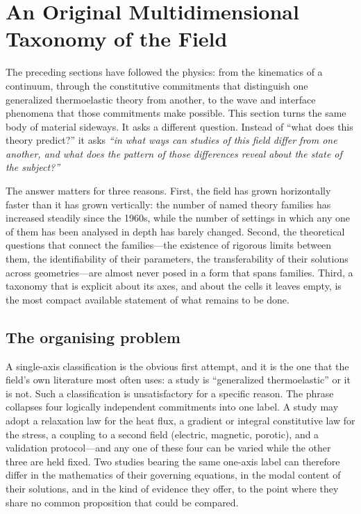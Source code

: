 \section{An Original Multidimensional Taxonomy of the Field}
\label{sec:taxonomy}

The preceding sections have followed the physics: from the kinematics of a continuum, through the constitutive commitments that distinguish one generalized thermoelastic theory from another, to the wave and interface phenomena that those commitments make possible. This section turns the same body of material sideways. It asks a different question. Instead of ``what does this theory predict?'' it asks \emph{``in what ways can studies of this field differ from one another, and what does the pattern of those differences reveal about the state of the subject?''}

The answer matters for three reasons. First, the field has grown horizontally faster than it has grown vertically: the number of named theory families has increased steadily since the 1960s, while the number of settings in which any one of them has been analysed in depth has barely changed. Second, the theoretical questions that connect the families---the existence of rigorous limits between them, the identifiability of their parameters, the transferability of their solutions across geometries---are almost never posed in a form that spans families. Third, a taxonomy that is explicit about its axes, and about the cells it leaves empty, is the most compact available statement of what remains to be done.

\subsection{The organising problem}
\label{sec:14.1}

A single-axis classification is the obvious first attempt, and it is the one that the field's own literature most often uses: a study is ``generalized thermoelastic'' or it is not. Such a classification is unsatisfactory for a specific reason. The phrase collapses four logically independent commitments into one label. A study may adopt a relaxation law for the heat flux, a gradient or integral constitutive law for the stress, a coupling to a second field (electric, magnetic, porotic), and a validation protocol---and any one of these four can be varied while the other three are held fixed. Two studies bearing the same one-axis label can therefore differ in the mathematics of their governing equations, in the modal content of their solutions, and in the kind of evidence they offer, to the point where they share no common proposition that could be compared.

